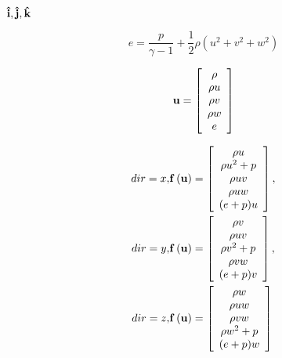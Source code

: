 \documentclass{article}
\begin{document}
${\bf \hat{i}},{\bf \hat{j}}, {\bf \hat{k}}$
\pagebreak

\begin{equation} e = \frac {p} {\gamma-1} + \frac{1}{2} \rho \left(u^2 + v^2 + w^2\right) \end{equation}
\pagebreak

\begin{equation} {\bf u} = \left[\begin{array}{c} \rho \\ \rho u \\ \rho v \\ \rho w \\ e \end{array}\right] \end{equation}
\pagebreak

\begin{eqnarray} dir = x, & {\bf f}\left({\bf u}\right) = \left[\begin{array}{c} \rho u \\ \rho u^2 + p \\ \rho u v \\ \rho u w \\ (e+p)u \end{array}\right], \\ dir = y, & {\bf f}\left({\bf u}\right) = \left[\begin{array}{c} \rho v \\ \rho u v \\ \rho v^2 + p \\ \rho v w \\ (e+p)v \end{array}\right], \\ dir = z, & {\bf f}\left({\bf u}\right) = \left[\begin{array}{c} \rho w \\ \rho u w \\ \rho v w \\ \rho w^2 + p \\ (e+p)w \end{array}\right] \end{eqnarray}
\pagebreak
\end{document}
